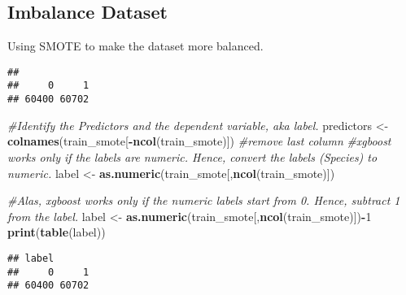 \documentclass[11pt,]{article}
\newenvironment{Shaded}{\begin{snugshade}}{\end{snugshade}}
\newcommand{\KeywordTok}[1]{\textcolor[rgb]{0.13,0.29,0.53}{\textbf{#1}}}
\newcommand{\DataTypeTok}[1]{\textcolor[rgb]{0.13,0.29,0.53}{#1}}
\newcommand{\DecValTok}[1]{\textcolor[rgb]{0.00,0.00,0.81}{#1}}
\newcommand{\StringTok}[1]{\textcolor[rgb]{0.31,0.60,0.02}{#1}}
\newcommand{\CommentTok}[1]{\textcolor[rgb]{0.56,0.35,0.01}{\textit{#1}}}
\newcommand{\OperatorTok}[1]{\textcolor[rgb]{0.81,0.36,0.00}{\textbf{#1}}}
\newcommand{\NormalTok}[1]{#1}
\begin{document}
\subsection{Imbalance Dataset}\label{imbalance-dataset}

Using SMOTE to make the dataset more balanced.

\begin{Shaded}
\end{Shaded}

\begin{verbatim}
## 
##     0     1 
## 60400 60702
\end{verbatim}

\begin{Shaded}
\begin{Highlighting}[]
\CommentTok{#Identify the Predictors and the dependent variable, aka label.}
\NormalTok{predictors <-}\StringTok{ }\KeywordTok{colnames}\NormalTok{(train_smote[}\OperatorTok{-}\KeywordTok{ncol}\NormalTok{(train_smote)]) }\CommentTok{#remove last column}
\CommentTok{#xgboost works only if the labels are numeric. Hence, convert the labels (Species) to numeric.}
\NormalTok{label <-}\StringTok{ }\KeywordTok{as.numeric}\NormalTok{(train_smote[,}\KeywordTok{ncol}\NormalTok{(train_smote)])}

\CommentTok{#Alas, xgboost works only if the numeric labels start from 0. Hence, subtract 1 from the label.}
\NormalTok{label <-}\StringTok{ }\KeywordTok{as.numeric}\NormalTok{(train_smote[,}\KeywordTok{ncol}\NormalTok{(train_smote)])}\OperatorTok{-}\DecValTok{1}
\KeywordTok{print}\NormalTok{(}\KeywordTok{table}\NormalTok{(label))}
\end{Highlighting}
\end{Shaded}

\begin{verbatim}
## label
##     0     1 
## 60400 60702
\end{verbatim}
\end{document}
